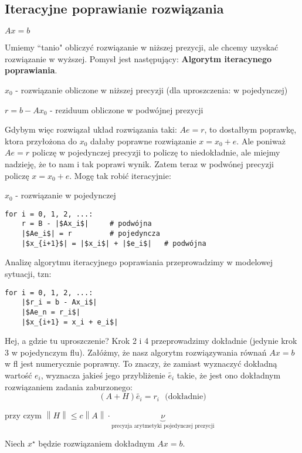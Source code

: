 \documentclass[hidelinks,a4paper,fleqn,oneside]{book}
\newcommand{\norm}[1]{\left\lVert#1\right\rVert}
\begin{document}
\subsection{Iteracyjne poprawianie rozwiązania}

$Ax = b$

Umiemy ``tanio" obliczyć rozwiązanie w niższej prezycji, ale chcemy uzyskać rozwiązanie w wyższej. Pomysł jest następujący: \textbf{Algorytm iteracynego poprawiania}.

$x_0$ - rozwiązanie obliczone w niższej precyzji (dla uproszczenia: w pojedynczej)

$r = b-Ax_0$ - reziduum obliczone w podwójnej prezycji

Gdybym więc rozwiązał układ rozwiązania taki: $Ae = r$, to dostałbym poprawkę, ktora przyłożona do $x_0$ dałaby poprawne rozwiązanie $x = x_0 + e$. Ale poniważ $Ae = r$ policzę w pojedynczej precyzji to policzę to niedokładnie, ale miejmy nadzieję, że to nam i tak poprawi wynik. Zatem teraz w podwónej precyzji policzę $x = x_0 + e$. Mogę tak robić iteracyjnie:

$x_0$ - rozwiązanie w pojedynczej
\begin{verbatim}
for i = 0, 1, 2, ...:
    r = B - |$Ax_i$|     # podwójna
    |$Ae_i$| = r         # pojedyncza
    |$x_{i+1}$| = |$x_i$| + |$e_i$|   # podwójna
\end{verbatim}


Analizę algorytmu iteracyjnego poprawiania przeprowadzimy w modelowej sytuacji, tzn:
\begin{verbatim}
for i = 0, 1, 2, ...:
    |$r_i = b - Ax_i$|
    |$Ae_n = r_i$|
    |$x_{i+1} = x_i + e_i$|
\end{verbatim}
Hej, a gdzie tu uproszczenie? Krok 2 i 4 przeprowadzimy dokładnie (jedynie krok 3 w pojedynczym flu). Załóżmy, że nasz algorytm rozwiązywania równań $Ax = b$ w fl jest numerycznie poprawny. To znaczy, że zamiast wyznaczyć dokładną wartość $e_i$, wyznacza jakieś jego przybliżenie $\tilde{e_i}$ takie, że jest ono dokładnym rozwiązaniem zadania zaburzonego:
\[
	(A + H)\tilde{e_i} = r_i \ \ \ \textrm{(dokładnie)}
\]

przy czym $\norm{H} \leq c \norm{A} \cdot \underbrace{\nu}_{\textrm{precyzja arytmetyki pojedynczej prezycji}}$

Niech $x^\star$ będzie rozwiązaniem dokładnym $Ax = b$.
\end{document}
